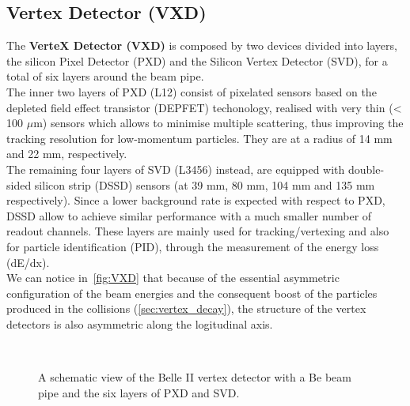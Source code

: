 \begin{comment}
\begin{table}[h!]
\centering
\texttt{[image: detector\_summary]}
\caption{Summary of the main characteristics of all subdetectors.}
\label{detector_summary}
\end{table}
\end{comment}


\subsection{Vertex Detector (VXD)}


The \textbf{VerteX Detector (VXD)} is composed by two devices divided into layers, the silicon Pixel Detector (PXD) and the Silicon Vertex Detector (SVD), for a total of six layers around the beam pipe.\\
The inner two layers of PXD (L12) consist of pixelated sensors based on the depleted field effect transistor (DEPFET) techonology, realised with very thin (< 100 $\mu$m) sensors which allows to minimise multiple scattering, thus improving the tracking resolution for low-momentum particles. They are at a radius of 14 mm and 22 mm, respectively. \\
The remaining four layers of SVD (L3456) instead, are equipped with double-sided silicon strip (DSSD) sensors (at 39 mm, 80 mm, 104 mm and 135 mm respectively). Since a lower background rate is expected with respect to PXD, DSSD allow to achieve similar performance with a much smaller number of readout channels.
These layers are mainly used for tracking/vertexing and also for particle identification (PID), through the measurement of the energy loss (dE/dx).\\

We can notice in~\autoref{fig:VXD} that because of the essential asymmetric configuration of the beam energies and the consequent boost of the particles produced in the collisions (\autoref{sec:vertex_decay}), the structure of the vertex detectors is also asymmetric along the logitudinal axis.

\begin{figure}[h!]
\centering
{}\quad
{}\\
\caption{A schematic view of the Belle II vertex detector with a Be beam pipe and the six layers of PXD and SVD.}
\label{fig:VXD}
\end{figure}


